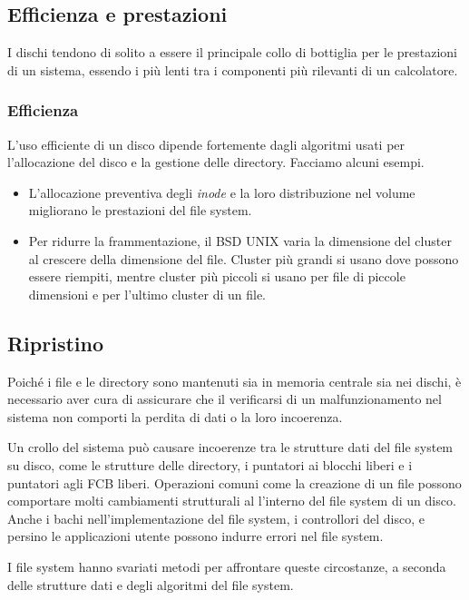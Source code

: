 \documentclass[11pt,a4paper]{article}
\begin{document}
{\subsection{Efficienza e prestazioni}
I dischi tendo­no di solito a essere il principale collo di bottiglia per le prestazioni di un sistema, essendo i più lenti tra i componenti più rilevanti di un calcolatore.

\subsubsection{Efficienza}
L'uso efficiente di un disco dipende fortemente dagli algoritmi usati per l'allocazione del di­sco e la gestione delle directory. Facciamo alcuni esempi.
\begin{itemize}
  \item L'allocazione preventiva degli \emph{inode} e la loro distribuzione nel vo­lume migliorano le prestazioni del file system.
  \item Per ridurre la frammentazione, il BSD UNIX varia la dimensione del cluster al crescere della dimensione del file. Cluster più grandi si usano dove possono essere riempiti, mentre cluster più piccoli si usano per file di piccole dimensioni e per l'ultimo cluster di un file.
\end{itemize}

\subsection{Ripristino}
Poiché i file e le directory sono mantenuti sia in memoria centrale sia nei dischi, è necessa­rio aver cura di assicurare che il verificarsi di un malfunzionamento nel sistema non com­porti la perdita di dati o la loro incoerenza.

Un crollo del sistema può causare incoerenze tra le strutture dati del file system su di­sco, come le strutture delle directory, i puntatori ai blocchi liberi e i puntatori agli FCB libe­ri.
Operazioni
comuni come la creazione di un file possono comportare molti cambiamenti strutturali al­
l'interno del file system di un disco.
Anche i bachi nell'implementazione del file system, i controllori del disco, e
persino le applicazioni utente possono indurre errori nel file system.

I file system hanno sva­riati metodi per affrontare queste circostanze, a seconda delle strutture dati e degli algoritmi
del file system.

}
\end{document}
